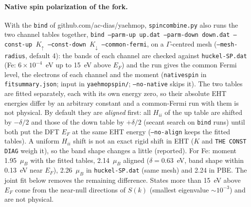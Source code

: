 \documentclass[11pt,a4paper]{article}
\newcommand{\cmd}[1]{\texttt{#1}}
\renewcommand{\_}{\origunderscore\allowbreak}
\begin{document}
\paragraph{Native spin polarization of the fork.} With the \cmd{bind} of github.com/ac-dias/yaehmop, \cmd{spin\_combine.py}
also runs the two channel tables together, \cmd{bind --parm-up up.dat --parm-down down.dat --const-up $K_\uparrow$
--const-down $K_\downarrow$ --common-fermi}, on a $\Gamma$-centred mesh (\cmd{--mesh-radius}, default 4): the bands of each channel
are checked against \cmd{huckel-SP.dat} (Fe: $6\times10^{-4}$~eV up to 15~eV above $E_F$) and the run gives the common Fermi
level, the electrons of each channel and the moment (\cmd{native\_spin} in \cmd{fit\_summary.json}; input in
\cmd{yaehmop\_spin/}; \cmd{--no-native} skips it). The two tables are fitted separately, each with its own energy zero, so their
absolute EHT energies differ by an arbitrary constant and a common-Fermi run with them is not physical. By default they are
\emph{aligned} first: all $H_{ii}$ of the up table are shifted by $-\delta/2$ and those of the down table by $+\delta/2$ (secant
search on \cmd{bind} runs) until both put the DFT $E_F$ at the same EHT energy (\cmd{--no-align} keeps the fitted tables). A uniform
$H_{ii}$ shift is not an exact rigid shift in EHT ($K$ and \cmd{THE CONST DIAG} weigh it), so the band shape changes a little
(reported). For Fe: moment 1.95~$\mu_B$ with the fitted tables, 2.14~$\mu_B$ aligned ($\delta=0.63$~eV, band shape within 0.13~eV
near $E_F$), 2.26~$\mu_B$ in \cmd{huckel-SP.dat} (same mesh) and 2.24 in PBE. The joint fit below removes the remaining
difference. States more than 15~eV above
$E_F$ come from the near-null directions of $S(k)$ (smallest eigenvalue $\sim10^{-3}$) and are not physical.
\end{document}
